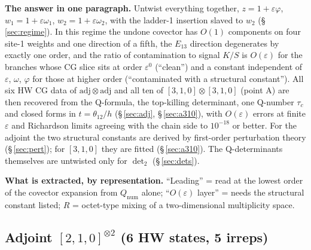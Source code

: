 \documentclass[10pt]{article}
\begin{document}
\textbf{The answer in one paragraph.} Untwist everything together, $z=1+\varepsilon\varphi$, $w_1=1+\varepsilon\omega_1$, $w_2=1+\varepsilon\omega_2$, with the ladder-1 insertion slaved to $w_2$ (\S\,\ref{sec:regime}). In this regime the undone covector has $O(1)$ components on four site-1 weights and one direction of a fifth, the $E_{13}$ direction degenerates by exactly one order, and the ratio of contamination to signal $K/S$ is $O(\varepsilon)$ for the branches whose CG slice sits at order $\varepsilon^0$ (``clean'') and a constant independent of $\varepsilon$, $\omega$, $\varphi$ for those at higher order (``contaminated with a structural constant''). All six HW CG data of $\mathrm{adj}\otimes\mathrm{adj}$ and all ten of $[3,1,0]\otimes[3,1,0]$ (point A) are then recovered from the Q-formula, the top-killing determinant, one Q-number $\tau_c$ and closed forms in $t=\theta_{12}/h$ (\S\,\ref{sec:adj}, \S\,\ref{sec:a310}), with $O(\varepsilon)$ errors at finite $\varepsilon$ and Richardson limits agreeing with the chain side to $10^{-18}$ or better. For the adjoint the two structural constants are derived by first-order perturbation theory (\S\,\ref{sec:pert}); for $[3,1,0]$ they are fitted (\S\,\ref{sec:a310}). The Q-determinants themselves are untwisted only for $\det_2$ (\S\,\ref{sec:dets}).

\textbf{What is extracted, by representation.} ``Leading'' = read at the lowest order of the covector expansion from $Q_{\mathrm{num}}$ alone; ``$O(\varepsilon)$ layer'' = needs the structural constant listed; $R$ = octet-type mixing of a two-dimensional multiplicity space.

\subsection{Adjoint $[2,1,0]^{\otimes2}$ (6 HW states, 5 irreps)}
\end{document}
